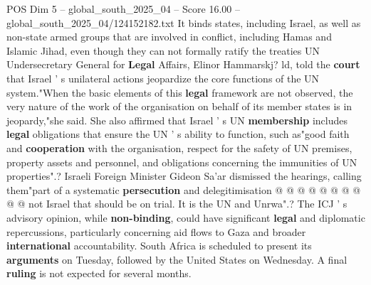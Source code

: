 \begin{textsample}{POS Dim 5 – global\_south\_2025\_04 – Score 16.00 – global\_south\_2025\_04/124152182.txt}
It binds states, including Israel, as well as non-state armed groups that are involved in conflict, including Hamas and Islamic Jihad, even though they can not formally ratify the treaties UN Undersecretary General for \textbf{Legal} Affairs, Elinor Hammarskj? ld, told the \textbf{court} that Israel ' s unilateral actions jeopardize the core functions of the UN system."When the basic elements of this \textbf{legal} framework are not observed, the very nature of the work of the organisation on behalf of its member states is in jeopardy,"she said.
She also affirmed that Israel ' s UN \textbf{membership} includes \textbf{legal} obligations that ensure the UN ' s ability to function, such as"good faith and \textbf{cooperation} with the organisation, respect for the safety of UN premises, property assets and personnel, and obligations concerning the immunities of UN properties".?
Israeli Foreign Minister Gideon Sa'ar dismissed the hearings, calling them"part of a systematic \textbf{persecution} and delegitimisation @ @ @ @ @ @ @ @ @ @ not Israel that should be on trial.
It is the UN and Unrwa".?
The ICJ ' s advisory opinion, while \textbf{non-binding}, could have significant \textbf{legal} and diplomatic repercussions, particularly concerning aid flows to Gaza and broader \textbf{international} accountability.
South Africa is scheduled to present its \textbf{arguments} on Tuesday, followed by the United States on Wednesday.
A final \textbf{ruling} is not expected for several months.

\end{textsample}
